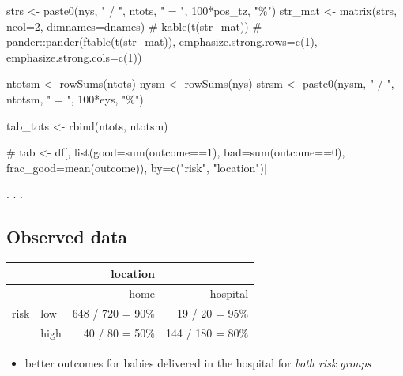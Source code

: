 \documentclass[
  letterpaper,
  DIV=11,
  numbers=noendperiod]{scrartcl}
\newenvironment{Shaded}{\begin{snugshade}}{\end{snugshade}}
\newcommand{\AttributeTok}[1]{\textcolor[rgb]{0.40,0.45,0.13}{#1}}
\newcommand{\CommentTok}[1]{\textcolor[rgb]{0.37,0.37,0.37}{#1}}
\newcommand{\DecValTok}[1]{\textcolor[rgb]{0.68,0.00,0.00}{#1}}
\newcommand{\FunctionTok}[1]{\textcolor[rgb]{0.28,0.35,0.67}{#1}}
\newcommand{\NormalTok}[1]{\textcolor[rgb]{0.00,0.23,0.31}{#1}}
\newcommand{\OtherTok}[1]{\textcolor[rgb]{0.00,0.23,0.31}{#1}}
\newcommand{\SpecialCharTok}[1]{\textcolor[rgb]{0.37,0.37,0.37}{#1}}
\newcommand{\StringTok}[1]{\textcolor[rgb]{0.13,0.47,0.30}{#1}}
\providecommand{\tightlist}{%
  \setlength{\itemsep}{0pt}\setlength{\parskip}{0pt}}\usepackage{longtable,booktabs,array}
\begin{document}
\begin{Shaded}
\begin{Highlighting}[]
\NormalTok{strs }\OtherTok{\textless{}{-}} \FunctionTok{paste0}\NormalTok{(nys, }\StringTok{" / "}\NormalTok{, ntots, }\StringTok{" = "}\NormalTok{, }\DecValTok{100}\SpecialCharTok{*}\NormalTok{pos\_tz, }\StringTok{"\%"}\NormalTok{)}
\NormalTok{str\_mat }\OtherTok{\textless{}{-}} \FunctionTok{matrix}\NormalTok{(strs, }\AttributeTok{ncol=}\DecValTok{2}\NormalTok{, }\AttributeTok{dimnames=}\NormalTok{dnames)}
\CommentTok{\# kable(t(str\_mat))}
\CommentTok{\# pander::pander(ftable(t(str\_mat)), emphasize.strong.rows=c(1), emphasize.strong.cols=c(1))}

\NormalTok{ntotsm }\OtherTok{\textless{}{-}} \FunctionTok{rowSums}\NormalTok{(ntots)}
\NormalTok{nysm }\OtherTok{\textless{}{-}} \FunctionTok{rowSums}\NormalTok{(nys)}
\NormalTok{strsm }\OtherTok{\textless{}{-}} \FunctionTok{paste0}\NormalTok{(nysm, }\StringTok{" / "}\NormalTok{, ntotsm, }\StringTok{" = "}\NormalTok{, }\DecValTok{100}\SpecialCharTok{*}\NormalTok{eys, }\StringTok{"\%"}\NormalTok{)}

\NormalTok{tab\_tots }\OtherTok{\textless{}{-}} \FunctionTok{rbind}\NormalTok{(ntots, ntotsm)}


\CommentTok{\# tab \textless{}{-} df[, list(good=sum(outcome==1), bad=sum(outcome==0), frac\_good=mean(outcome)), by=c("risk", "location")]}
\end{Highlighting}
\end{Shaded}

. . .

\subsection{Observed data}\label{observed-data}

\begin{longtable}[]{@{}llrr@{}}
\toprule\noalign{}
& & location & \\
\midrule\noalign{}
\endhead
\bottomrule\noalign{}
\endlastfoot
& & home & hospital \\
risk & low & 648 / 720 = 90\% & 19 / 20 = 95\% \\
& high & 40 / 80 = 50\% & 144 / 180 = 80\% \\
\end{longtable}

\begin{itemize}
\tightlist
\item
  better outcomes for babies delivered in the hospital for \emph{both
  risk groups}
\end{itemize}
\end{document}
